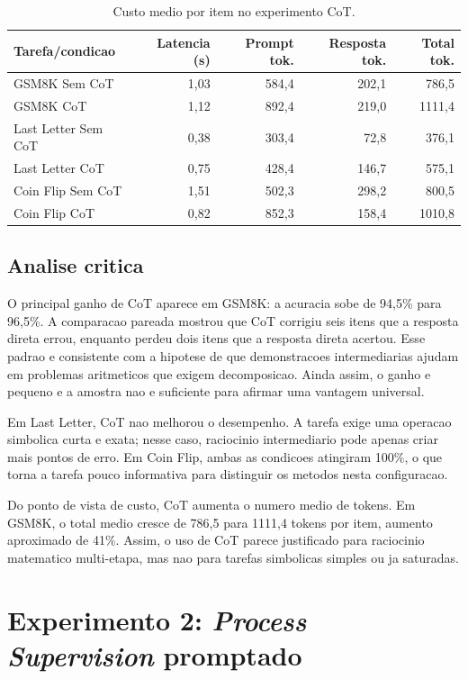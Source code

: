 \documentclass[a4paper,12pt]{article}
\begin{document}
\begin{table}[h]
\centering
\caption{Custo medio por item no experimento CoT.}
\label{tab:cot_cost}
\begin{tabular}{lrrrr}
\toprule
Tarefa/condicao & Latencia (s) & Prompt tok. & Resposta tok. & Total tok. \\
\midrule
GSM8K Sem CoT & 1,03 & 584,4 & 202,1 & 786,5 \\
GSM8K CoT & 1,12 & 892,4 & 219,0 & 1111,4 \\
Last Letter Sem CoT & 0,38 & 303,4 & 72,8 & 376,1 \\
Last Letter CoT & 0,75 & 428,4 & 146,7 & 575,1 \\
Coin Flip Sem CoT & 1,51 & 502,3 & 298,2 & 800,5 \\
Coin Flip CoT & 0,82 & 852,3 & 158,4 & 1010,8 \\
\bottomrule
\end{tabular}
\end{table}

\subsection{Analise critica}

O principal ganho de CoT aparece em GSM8K: a acuracia sobe de 94,5\% para
96,5\%. A comparacao pareada mostrou que CoT corrigiu seis itens que a resposta
direta errou, enquanto perdeu dois itens que a resposta direta acertou. Esse
padrao e consistente com a hipotese de que demonstracoes intermediarias ajudam
em problemas aritmeticos que exigem decomposicao. Ainda assim, o ganho e
pequeno e a amostra nao e suficiente para afirmar uma vantagem universal.

Em Last Letter, CoT nao melhorou o desempenho. A tarefa exige uma operacao
simbolica curta e exata; nesse caso, raciocinio intermediario pode apenas criar
mais pontos de erro. Em Coin Flip, ambas as condicoes atingiram 100\%, o que
torna a tarefa pouco informativa para distinguir os metodos nesta configuracao.

Do ponto de vista de custo, CoT aumenta o numero medio de tokens. Em GSM8K, o
total medio cresce de 786,5 para 1111,4 tokens por item, aumento aproximado de
41\%. Assim, o uso de CoT parece justificado para raciocinio matematico
multi-etapa, mas nao para tarefas simbolicas simples ou ja saturadas.

\section{Experimento 2: \textit{Process Supervision} promptado}
\end{document}
